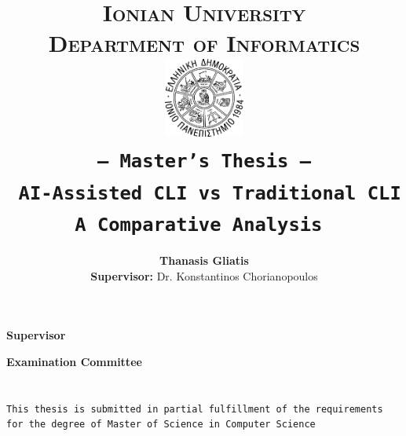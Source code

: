 \documentclass[a4paper,11pt,oneside,openany]{styles/ioniothesis}
\begin{document}
\author{\textbf{Thanasis Gliatis} \\ \textbf{Supervisor:}  Dr. Konstantinos Chorianopoulos}
\title{
	\textbf{\LARGE{\textsc{Ionian University}}
		\bigskip \\
		\large{\textsc{Department of Informatics}}
		\bigskip \\ \bigskip \bigskip \bigskip
		\bigskip \bigskip
		\includegraphics[width=0.2\textwidth]{./assets/figures/ionio_logo.pdf}
		\bigskip \\ \bigskip
		\texttt{\large{-- Master's Thesis --}}
		\bigskip \\ \bigskip
		\textbf{\Large{\texttt{
			AI-Assisted CLI vs Traditional CLI \\
			A Comparative Analysis
		}}}
		\bigskip \\ \bigskip}
}
\maketitle


\pagestyle{empty}
\cleardoublepage


\chapter*{}
\thispagestyle{empty}

\begin{center}
	\Large{\textbf{Supervisor}}
\end{center}

\begin{center}
	\Large{\textbf{Examination Committee}}
\end{center}


\pagestyle{empty}
\cleardoublepage


\chapter*{}
\thispagestyle{empty}
\begin{center}
	\texttt{This thesis is submitted in partial fulfillment of the requirements for the degree of Master of Science in Computer Science}
\end{center}
\end{document}
